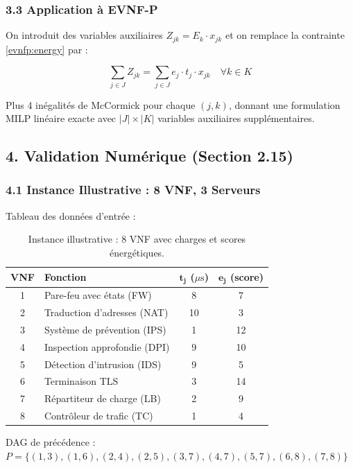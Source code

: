 \documentclass{article}
\begin{document}
\subsubsection{3.3 Application à EVNF-P}

On introduit des variables auxiliaires $Z_{jk} = E_k \cdot x_{jk}$ et on remplace la contrainte \eqref{evnfp:energy} par :

\[
\sum_{j \in J} Z_{jk} = \sum_{j \in J} e_j \cdot t_j \cdot x_{jk} \quad \forall k \in K
\]

Plus 4 inégalités de McCormick pour chaque $(j, k)$, donnant une formulation MILP linéaire exacte avec $|J| \times |K|$ variables auxiliaires supplémentaires.

\subsection{4. Validation Numérique (Section 2.15)}

\subsubsection{4.1 Instance Illustrative : 8 VNF, 3 Serveurs}

Tableau des données d'entrée :

\begin{table}[h!]
\centering
\small
\begin{tabular}{c l c c}
\toprule
\textbf{VNF} & \textbf{Fonction} & $\boldsymbol{t_j}$ ($\mu\text{s}$) & $\boldsymbol{e_j}$ (score) \\
\midrule
1 & Pare-feu avec états (FW) & 8 & 7 \\
2 & Traduction d'adresses (NAT) & 10 & 3 \\
3 & Système de prévention (IPS) & 1 & 12 \\
4 & Inspection approfondie (DPI) & 9 & 10 \\
5 & Détection d'intrusion (IDS) & 9 & 5 \\
6 & Terminaison TLS & 3 & 14 \\
7 & Répartiteur de charge (LB) & 2 & 9 \\
8 & Contrôleur de trafic (TC) & 1 & 4 \\
\bottomrule
\end{tabular}
\caption{Instance illustrative : 8 VNF avec charges et scores énergétiques.}
\end{table}

DAG de précédence : $P = \{(1,3), (1,6), (2,4), (2,5), (3,7), (4,7), (5,7), (6,8), (7,8)\}$
\end{document}
